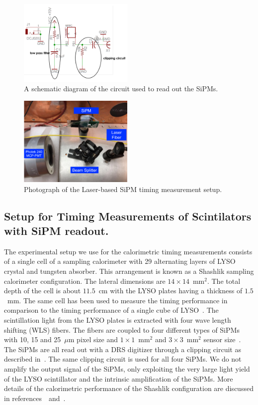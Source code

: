 \begin{figure}[htbp]
\centering
\includegraphics[width=0.49\textwidth]{figures/CircuitDiagram.pdf}
\caption{A schematic diagram of the circuit used to read out the SiPMs.}
\label{fig:Circuit}
\end{figure}


\begin{figure}[htbp] 
\centering
\includegraphics[width=0.49\textwidth]{figures/SiPMSetup1.pdf} 
\caption{Photograph of the Laser-based SiPM timing measurement setup.} 
\label{fig:laserSetup} 
\end{figure} 

\subsection{Setup for Timing Measurements of Scintilators with SiPM readout.}

The experimental setup we use for the calorimetric timing measurements consists
of a single cell of a sampling calorimeter with 29 alternating layers of LYSO
crystal and tungsten absorber. This arrangement is known as a Shashlik sampling
calorimeter configuration. The lateral dimensions are
$14\times14$~$\mathrm{mm}^{2}$. The total depth of the cell is about $11.5$~cm
with the LYSO plates having a thickness of $1.5$~mm. The same cell has been used
to measure the timing performance in comparison to the timing performance of a
single cube of LYSO~\cite{lysotiming}. The scintillation light from the LYSO
plates is extracted with four wave length shifting (WLS) fibers. The fibers are
coupled to four different types of SiPMs with 10, 15 and 25~$\mu$m pixel size
and $1\times 1$~$\mathrm{mm}^{2}$ and $3\times 3$~$\mathrm{mm}^{2}$ sensor
size~\cite{hama}. The SiPMs are all read out with a DRS digitizer through a
clipping circuit as described in~\cite{aashrita}. The same clipping circuit is 
used for all four SiPMs. We do not amplify the output
signal of the SiPMs, only exploiting the very large light yield of the LYSO
scintillator and the intrinsic amplification of the SiPMs. More details of the
calorimetric performance of the Shashlik configuration are discussed in
references~\cite{shashlik1}~and~\cite{shashlik2}.

